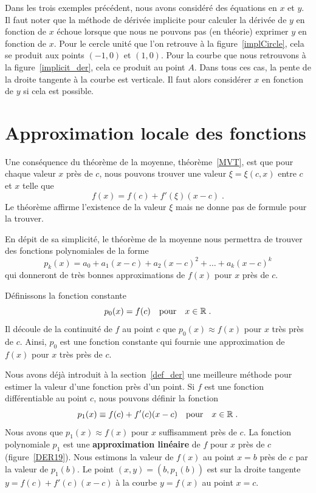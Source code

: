 {

\begin{rmk}
Dans les trois exemples précédent, nous avons considéré des équations
en $x$ et $y$.  Il faut noter que la méthode de dérivée implicite pour
calculer la dérivée de $y$ en fonction de $x$ échoue lorsque que nous
ne pouvons pas (en théorie) exprimer $y$ en fonction de $x$.  Pour le
cercle unité que l'on retrouve à la figure~\ref{implCircle}, cela se
produit aux points $(-1,0)$ et $(1,0)$.  Pour la courbe que nous
retrouvons à la figure~\ref{implicit_der}, cela ce produit au point
$A$.  Dans tous ces cas, la pente de la droite tangente à la courbe
est verticale.  Il faut alors considérer $x$ en fonction de $y$ si
cela est possible.
\end{rmk}

\section{Approximation locale des fonctions} \label{approx_local}

Une conséquence du théorème de la moyenne, théorème~\ref{MVT}, est que
pour chaque valeur $x$ près de $c$, nous pouvons trouver une valeur
$\xi = \xi(c,x)$ entre $c$ et $x$ telle que
\[
f(x) = f(c) + f'(\xi)(x-c) \; .
\]
Le théorème affirme l'existence de la valeur $\xi$ mais ne donne pas
de formule pour la trouver.

En dépit de sa simplicité, le théorème de la moyenne nous permettra de trouver
des fonctions polynomiales de la forme
\[
p_k(x)=a_0 + a_1(x-c) + a_2(x-c)^2 + \ldots + a_k(x-c)^k
\]
qui donneront de très bonnes approximations de $f(x)$ pour $x$ près de
$c$.

Définissons la fonction constante
\[
p_0(x) = f(c)  \quad \text{pour} \quad x \in \mathbb{R} \;.
\]
Il découle de la continuité de $f$ au point $c$ que
$p_0(x) \approx f(x)$ pour $x$ très près de $c$.  Ainsi, $p_0$ est
une fonction constante qui fournie une approximation de $f(x)$ pour
$x$ très près de $c$. 

Nous avons déjà introduit à la section~\ref{def_der} une meilleure méthode
pour estimer la valeur d'une fonction près d'un point.  Si $f$ est une
fonction différentiable au point $c$, nous pouvons définir la fonction
\[
p_1(x) \equiv f(c) + f'(c)(x-c)  \quad \text{pour} \quad x \in \mathbb{R} \; .
\]
Nous avons que $p_1(x) \approx f(x)$ pour $x$ suffisamment près de $c$.  La
fonction polynomiale $p_1$ est une {\bfseries approximation linéaire}
de $f$ pour $x$ près de $c$ (figure~\ref{DER19}).  Nous estimons
la valeur de $f(x)$ au point $x=b$ près de $c$ par la valeur
de $p_1(b)$.  Le point $(x,y) = (b,p_1(b))$ est sur la droite
tangente $y = f(c) + f'(c)(x-c)$ à la courbe $y=f(x)$ au point
$x=c$.

}
